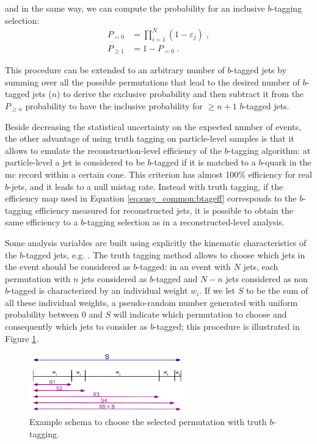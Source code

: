 \noindent and in the same way, we can compute the probability for an inclusive $b$-tagging selection:
\begin{equation}
 \begin{split}
        P_{=0} &= \prod\limits_{i=1}^N \left( 1 - \varepsilon_{j} \right) \; ,\\
        P_{\geq 1} &= 1 - P_{=0} \; . \nonumber
 \end{split}
\end{equation} 
 
\noindent This procedure can be extended to an arbitrary number of $b$-tagged jets by summing over all the possible permutations that lead to the desired number of $b$-tagged jets ($n$) to derive the exclusive probability and then subtract it from the $P_{\geq n}$ probability to have the inclusive probability for $\geq n+1$ $b$-tagged jets.
 
Beside decreasing the statistical uncertainty on the expected number of events, the other advantage of using truth tagging on particle-level samples is that it allows to emulate the reconstruction-level efficiency of the $b$-tagging algorithm: 
at particle-level a jet is considered to be $b$-tagged if it is matched to a $b$-quark in the \gls{mc} record within a certain cone. This criterion has 
almost 100\% efficiency for real $b$-jets, and it leads to a null mistag rate. Instead with truth tagging, if the efficiency map used in Equation \ref{eq:susy_common:btageff} corresponds to the $b$-tagging efficiency measured for reconstructed jets, 
it is possible to obtain the same efficiency to a $b$-tagging selection as in a reconstructed-level analysis. 

Some analysis variables are built using explicitly the kinematic characteristics of the $b$-tagged jets, e.g. \mtb. The truth tagging method allows to choose which jets in the event should be considered as $b$-tagged: in an event with $N$ jets, each permutation with $n$ jets considered as $b$-tagged and $N-n$ jets considered as non $b$-tagged is characterized by an individual weight $w_i$. If we let $S$ to be the sum of all these individual weights, a pseudo-random number generated with uniform probability between 0 and $S$ will indicate which permutation to choose and consequently which jets to consider as $b$-tagged; this procedure is illustrated in Figure \ref{fig:susy_common_trf_perm}. 

\begin{figure}[h]
\centering 
\includegraphics[width=0.6\textwidth]{figures/susy_common/trf_perm}
\caption{Example schema to choose the selected permutation with truth $b$-tagging.}\label{fig:susy_common_trf_perm}
\end{figure}


